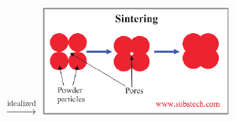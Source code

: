 \documentclass[11pt]{beamer} %
\begin{document}
\begin{frame}
\begin{center}
\begin{columns}
\begin{tikzpicture}
 \end{tikzpicture}
 \centering
 $\xrightarrow{\text{idealized}}$
 \centering
 \includegraphics[width=\textwidth]{figures/sinter_2-crop.pdf}
 \end{columns}
\end{center}
\end{frame}
\end{document}
